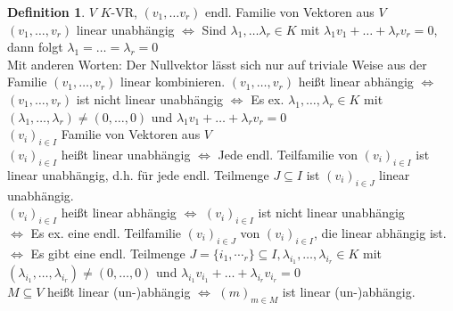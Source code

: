 \documentclass[10pt,a4paper,numbers=endperiod]{scrartcl}
\theoremstyle{definition}
\newtheorem{defi}[satz]{Definition}
\begin{document}
\newpage
\begin{defi}
	$V$ $K$-VR, $(v_1, \dots v_r)$ endl. Familie von Vektoren aus $V$\\
	$(v_1,\dots,v_r)$ linear unabhängig $\Leftrightarrow$ Sind $\lambda_1,\dots \lambda_r \in K$ mit $\lambda_1v_1+\dots+\lambda_rv_r = 0$, dann folgt $\lambda_1 = \ldots = \lambda_r=0$\\
	Mit anderen Worten: Der Nullvektor lässt sich nur auf triviale Weise aus der Familie $(v_1, \dots, v_r)$ linear kombinieren.
	$(v_1,\dots,v_r)$ heißt linear abhängig $\Leftrightarrow$ $(v_1, \dots, v_r)$ ist nicht linear unabhängig $\Leftrightarrow$ Es ex. $\lambda_1,\dots, \lambda_r \in K$ mit $(\lambda_1,\ldots, \lambda_r) \neq (0,\ldots,0)$ und $\lambda_1v_1+\dots+\lambda_rv_r=0$\\
	
	$(v_i)_{i\in I}$  Familie von Vektoren aus $V$\\
	$(v_i)_{i\in I}$ heißt linear unabhängig $\Leftrightarrow$ Jede endl. Teilfamilie von $(v_i)_{i\in I}$ ist linear unabhängig, d.h. für jede endl. Teilmenge $J \subseteq I$ ist $(v_i)_{i\in J}$ linear unabhängig.\\
	$(v_i)_{i \in I}$ heißt linear abhängig $\Leftrightarrow$ $(v_i)_{i \in I}$ ist nicht linear unabhängig\\ 
	$\Leftrightarrow$ Es ex. eine endl. Teilfamilie $(v_i)_{i\in J}$ von $(v_i)_{i\in I}$, die linear abhängig ist.\\
	$\Leftrightarrow$ Es gibt eine endl. Teilmenge $J=\{i_1,\dotsi_r\} \subseteq I, \lambda_{i_1}, \dots, \lambda_{i_r} \in K$ mit $(\lambda_{i_1}, \dots, \lambda_{i_r}) \neq (0, \ldots, 0)$ und $\lambda_{i_1} v_{i_1} + \ldots + \lambda_{i_r} v_{i_r} = 0$\\
	$M \subseteq V$ heißt linear (un-)abhängig $\Leftrightarrow$ $(m)_{m \in M}$ ist linear (un-)abhängig. 
\end{defi}
\end{document}
